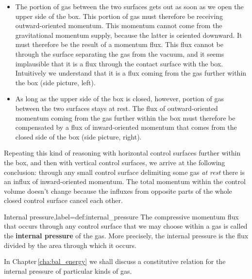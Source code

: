 \documentclass[a4paper,12pt,%
onecolumn,oneside,titlepage,%
british%
]{memoir}
\renewcommand*{\|}[1][]{\nonscript\:#1\vert\nonscript\:\mathopen{}}
\newcommand*{\chap}{Chapter}%
\begin{document}
\begin{itemize}
\item The portion of gas between the two surfaces gets out as soon as we open the upper side of the box. This portion of gas must therefore be receiving outward-oriented momentum. This momentum cannot come from the gravitational momentum supply, because the latter is oriented downward. It must therefore be the result of a momentum flux. This flux cannot be through the surface separating the gas from the vacuum, and it seems implausible that it is a flux through the contact surface with the box. Intuitively we understand that it is a flux coming from the gas further within the box (side picture, left).
\item As long as the upper side of the box is closed, however, portion of gas between the two surfaces stays at rest. The flux of outward-oriented momentum coming from the gas further within the box must therefore be compensated by a flux of inward-oriented momentum that comes from the closed side of the box (side picture, right).
\end{itemize}

%
Repeating this kind of reasoning with horizontal control surfaces further within the box, and then with vertical control surfaces, we arrive at the following conclusion: through any small control surface delimiting some gas \emph{at rest} there is an influx of inward-oriented momentum. The total momentum within the control volume doesn't change because the influxes from opposite parts of the whole closed control surface cancel each other.
\begin{definition}{Internal pressure,label={def:internal_pressure}}
  The compressive momentum flux that occurs through any control surface that we may choose within a gas is called the \textbf{internal pressure} of the gas. More precisely, the internal pressure is the flux divided by the area through which it occurs.
\end{definition}
In \chap\,\ref{cha:bal_energy} we shall discuss a constitutive relation for the internal pressure of particular kinds of gas.
\end{document}

